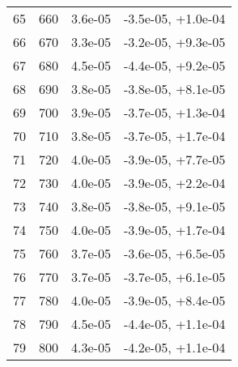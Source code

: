 \begin{table}
\begin{adjustbox}{width=1\textwidth/2}
\begin{tabular}{|c|c|c|c|}
\cline{1-4}
65 & 660 & 3.6e-05 & -3.5e-05, +1.0e-04 \\
\cline{1-4}
66 & 670 & 3.3e-05 & -3.2e-05, +9.3e-05 \\
\cline{1-4}
67 & 680 & 4.5e-05 & -4.4e-05, +9.2e-05 \\
\cline{1-4}
68 & 690 & 3.8e-05 & -3.8e-05, +8.1e-05 \\
\cline{1-4}
69 & 700 & 3.9e-05 & -3.7e-05, +1.3e-04 \\
\cline{1-4}
70 & 710 & 3.8e-05 & -3.7e-05, +1.7e-04 \\
\cline{1-4}
71 & 720 & 4.0e-05 & -3.9e-05, +7.7e-05 \\
\cline{1-4}
72 & 730 & 4.0e-05 & -3.9e-05, +2.2e-04 \\
\cline{1-4}
73 & 740 & 3.8e-05 & -3.8e-05, +9.1e-05 \\
\cline{1-4}
74 & 750 & 4.0e-05 & -3.9e-05, +1.7e-04 \\
\cline{1-4}
75 & 760 & 3.7e-05 & -3.6e-05, +6.5e-05 \\
\cline{1-4}
76 & 770 & 3.7e-05 & -3.7e-05, +6.1e-05 \\
\cline{1-4}
77 & 780 & 4.0e-05 & -3.9e-05, +8.4e-05 \\
\cline{1-4}
78 & 790 & 4.5e-05 & -4.4e-05, +1.1e-04 \\
\cline{1-4}
79 & 800 & 4.3e-05 & -4.2e-05, +1.1e-04 \\
\cline{1-4}
\end{tabular}
\end{adjustbox}
\end{table}

